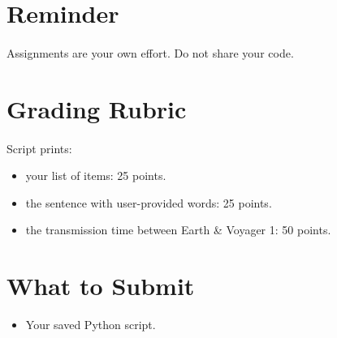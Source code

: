 \documentclass[letter,10pt]{article}
\begin{document}
    \section*{Reminder}
    \paragraph{}Assignments are your own effort. Do not share your code.
    
    \section*{Grading Rubric}
    \paragraph{}Script prints:
    \begin{itemize}
        \item your list of items: 25 points.
        \item the sentence with user-provided words: 25 points.
        \item the transmission time between Earth \& Voyager 1: 50 points.
    \end{itemize}
    
    \section*{What to Submit}
    \begin{itemize}
        \item Your saved Python script.
    \end{itemize}
    
\end{document}
